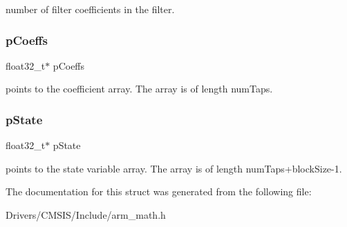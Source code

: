 number of filter coefficients in the filter. \mbox{\label{structarm__fir__instance__f32_aacbb8dd8eeba4b21fc2bb40076405ee3}} 
\subsubsection{\texorpdfstring{p\+Coeffs}{pCoeffs}}
{\footnotesize\ttfamily float32\+\_\+t$\ast$ p\+Coeffs}

points to the coefficient array. The array is of length num\+Taps. \mbox{\label{structarm__fir__instance__f32_a335c87e6fdc4b96601d95a5de8b9c463}} 
\subsubsection{\texorpdfstring{p\+State}{pState}}
{\footnotesize\ttfamily float32\+\_\+t$\ast$ p\+State}

points to the state variable array. The array is of length num\+Taps+block\+Size-\/1. 

The documentation for this struct was generated from the following file\+:\begin{DoxyCompactItemize}
\item 
Drivers/\+C\+M\+S\+I\+S/\+Include/arm\+\_\+math.\+h\end{DoxyCompactItemize}
